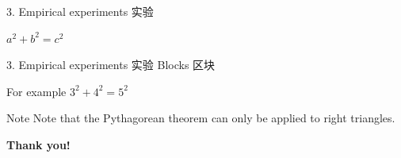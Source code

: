 \documentclass[CJKutf8]{beamer}
\begin{document}
\begin{CJK*}{UTF8}{gbsn}
\begin{frame}{3. Empirical experiments 实验}
      \begin{theorem}
        $a^2 + b^2 = c^2$
      \end{theorem}
  \end{frame} %

  \begin{frame}{3. Empirical experiments 实验}
    Blocks 区块

      \begin{exampleblock}{For example}
        $3^2 + 4^2 = 5^2$
      \end{exampleblock}

      \begin{alertblock}{Note}
         Note that the Pythagorean theorem can only be applied to right triangles.
      \end{alertblock}
  \end{frame} %

  \begin{frame}
    \begin{center}
      \Huge{\bf{Thank you!}}
    \end{center}
  \end{frame} %


\end{CJK*}
\end{document}
